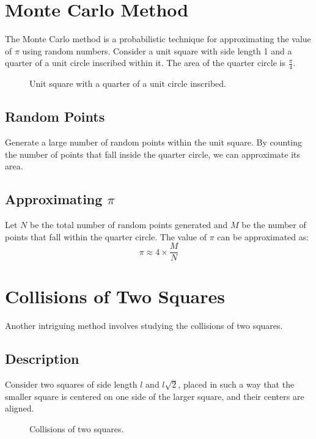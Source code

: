 \documentclass{article}
\begin{document}
\section{Monte Carlo Method}
The Monte Carlo method is a probabilistic technique for approximating the value of $\pi$ using random numbers. Consider a unit square with side length 1 and a quarter of a unit circle inscribed within it. The area of the quarter circle is $\frac{\pi}{4}$.

\begin{figure}[ht]
\centering
{}
\caption{Unit square with a quarter of a unit circle inscribed.}
\end{figure}

\subsection{Random Points}
Generate a large number of random points within the unit square. By counting the number of points that fall inside the quarter circle, we can approximate its area.

\subsection{Approximating $\pi$}
Let $N$ be the total number of random points generated and $M$ be the number of points that fall within the quarter circle. The value of $\pi$ can be approximated as:
\[
\pi \approx 4 \times \frac{M}{N}
\]

\section{Collisions of Two Squares}
Another intriguing method involves studying the collisions of two squares.

\subsection{Description}
Consider two squares of side length $l$ and $l\sqrt{2}$, placed in such a way that the smaller square is centered on one side of the larger square, and their centers are aligned.

\begin{figure}[ht]
\centering
{}
\caption{Collisions of two squares.}
\end{figure}
\end{document}
